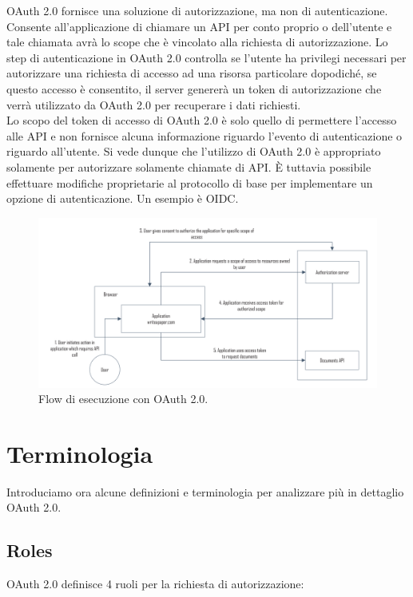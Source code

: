 OAuth 2.0 fornisce una soluzione di autorizzazione, ma non di autenticazione. Consente
all'applicazione di chiamare un API per conto proprio o dell'utente e tale chiamata
avrà lo scope che è vincolato alla richiesta di autorizzazione. Lo step di
autenticazione in OAuth 2.0 controlla se l'utente ha privilegi necessari per
autorizzare una richiesta di accesso ad una risorsa particolare dopodiché, se
questo accesso è consentito, il server genererà un token di autorizzazione che
verrà utilizzato da OAuth 2.0 per recuperare i dati richiesti.\\
Lo scopo del token di accesso di OAuth 2.0 è solo quello di permettere l'accesso alle
API e non fornisce alcuna informazione riguardo l'evento di autenticazione o riguardo
all'utente.
Si vede dunque che l'utilizzo di OAuth 2.0 è appropriato solamente per autorizzare
solamente chiamate di API. È tuttavia possibile effettuare modifiche proprietarie al
protocollo di base per implementare un opzione di autenticazione. Un esempio è
OIDC.

\begin{figure}[H]
    \centering
    \includegraphics[width=\textwidth, keepaspectratio]{capitoli/id_managing/imgs/api2.png}
    \caption{Flow di esecuzione con OAuth 2.0.}
\end{figure}

\section{Terminologia}

Introduciamo ora alcune definizioni e terminologia per analizzare più in dettaglio
OAuth 2.0.

\subsection{Roles}

OAuth 2.0 definisce 4 ruoli per la richiesta di autorizzazione:


